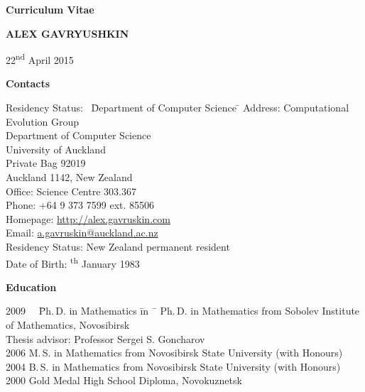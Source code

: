 \documentclass[12pt]{article}
\begin{document}
\centerline{\large \bf Curriculum Vitae}
\vskip5mm
\centerline{\Large \bfseries A\normalsize LEX \Large G\normalsize AVRYUSHKIN}
\vskip5mm
\centerline{22\textsuperscript{nd} April 2015}
\vskip5mm

\centerline{\bf Contacts}
\begin{tabbing}
Residency Status:     \  \= Department of Computer Science \= \kill
Address:        \> Computational Evolution Group \\
		\> Department of Computer Science \\
		\> University of Auckland\\
                \> Private Bag 92019\\
                \> Auckland 1142, New Zealand\\
Office:         \> Science Centre 303.367\\
Phone:          \> +64 9 373 7599 ext. 85506\\
Homepage:     \> \href{http://alex.gavruskin.com}{http://alex.gavruskin.com}   \\
Email:        \> \href{mailto:a.gavruskin@auckland.ac.nz}{a.gavruskin@auckland.ac.nz} \\
Residency Status:        \>New Zealand permanent resident\\
Date of Birth: \textsuperscript{th} January 1983
\end{tabbing}

\centerline{\bf Education}
\begin{tabbing}
2009 \ \ \= Ph.\,D. in Mathematics \= in \ \=        \> Ph.\,D. in Mathematics \>  from Sobolev Institute of Mathematics, Novosibirsk\\
                \>             \>  Thesis advisor: Professor Sergei S. Goncharov\\
2006       \> M.\,S. in Mathematics \>  from Novosibirsk State University (with Honours)\\
2004       \> B.\,S. in Mathematics \>  from Novosibirsk State University (with Honours)\\
2000       \> Gold Medal High School Diploma, Novokuznetsk\\
\end{tabbing}
\end{document}
